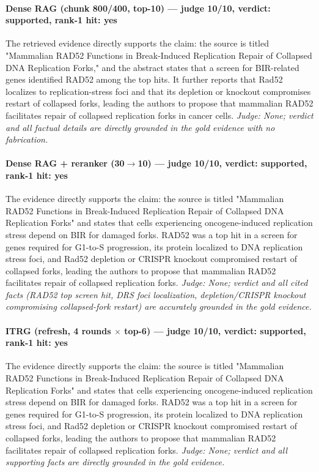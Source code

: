 \documentclass[sigconf, review, anonymous]{acmart}
\begin{document}
\paragraph{Dense RAG (chunk 800/400, top-10) --- judge 10/10, verdict: supported, rank-1 hit: yes}
\noindent The retrieved evidence directly supports the claim: the source is titled "Mammalian RAD52 Functions in Break-Induced Replication Repair of Collapsed DNA Replication Forks," and the abstract states that a screen for BIR-related genes identified RAD52 among the top hits. It further reports that Rad52 localizes to replication-stress foci and that its depletion or knockout compromises restart of collapsed forks, leading the authors to propose that mammalian RAD52 facilitates repair of collapsed replication forks in cancer cells.
\noindent\small\textit{Judge: None; verdict and all factual details are directly grounded in the gold evidence with no fabrication.}
\paragraph{Dense RAG + reranker (30$\to$10) --- judge 10/10, verdict: supported, rank-1 hit: yes}
\noindent The evidence directly supports the claim: the source is titled "Mammalian RAD52 Functions in Break-Induced Replication Repair of Collapsed DNA Replication Forks" and states that cells experiencing oncogene-induced replication stress depend on BIR for damaged forks. RAD52 was a top hit in a screen for genes required for G1-to-S progression, its protein localized to DNA replication stress foci, and Rad52 depletion or CRISPR knockout compromised restart of collapsed forks, leading the authors to propose that mammalian RAD52 facilitates repair of collapsed replication forks.
\noindent\small\textit{Judge: None; verdict and all cited facts (RAD52 top screen hit, DRS foci localization, depletion/CRISPR knockout compromising collapsed-fork restart) are accurately grounded in the gold evidence.}
\paragraph{ITRG (refresh, 4 rounds $\times$ top-6) --- judge 10/10, verdict: supported, rank-1 hit: yes}
\noindent The evidence directly supports the claim: the source is titled "Mammalian RAD52 Functions in Break-Induced Replication Repair of Collapsed DNA Replication Forks" and states that cells experiencing oncogene-induced replication stress depend on BIR for damaged forks. RAD52 was a top hit in a screen for genes required for G1-to-S progression, its protein localized to DNA replication stress foci, and Rad52 depletion or CRISPR knockout compromised restart of collapsed forks, leading the authors to propose that mammalian RAD52 facilitates repair of collapsed replication forks.
\noindent\small\textit{Judge: None; verdict and all supporting facts are directly grounded in the gold evidence.}
\end{document}
